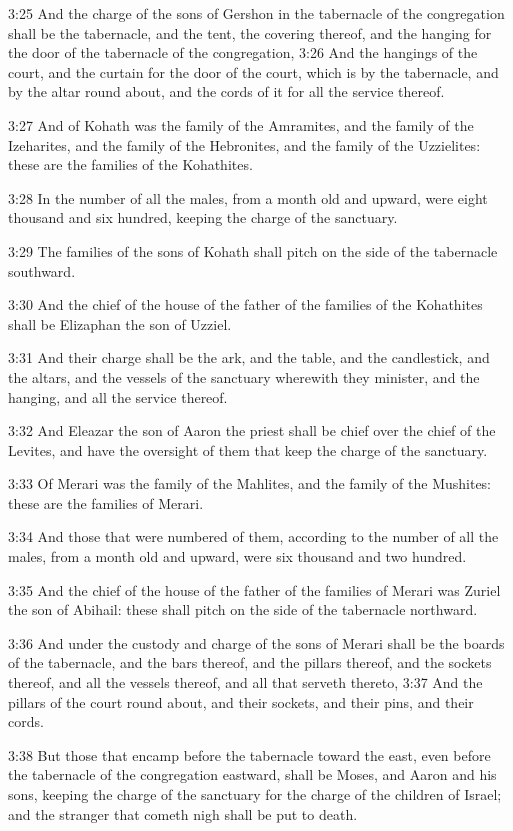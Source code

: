 3:25 And the charge of the sons of Gershon in the tabernacle of the congregation shall be the tabernacle, and the tent, the covering thereof, and the hanging for the door of the tabernacle of the congregation, 3:26 And the hangings of the court, and the curtain for the door of the court, which is by the tabernacle, and by the altar round about, and the cords of it for all the service thereof.

3:27 And of Kohath was the family of the Amramites, and the family of the Izeharites, and the family of the Hebronites, and the family of the Uzzielites: these are the families of the Kohathites.

3:28 In the number of all the males, from a month old and upward, were eight thousand and six hundred, keeping the charge of the sanctuary.

3:29 The families of the sons of Kohath shall pitch on the side of the tabernacle southward.

3:30 And the chief of the house of the father of the families of the Kohathites shall be Elizaphan the son of Uzziel.

3:31 And their charge shall be the ark, and the table, and the candlestick, and the altars, and the vessels of the sanctuary wherewith they minister, and the hanging, and all the service thereof.

3:32 And Eleazar the son of Aaron the priest shall be chief over the chief of the Levites, and have the oversight of them that keep the charge of the sanctuary.

3:33 Of Merari was the family of the Mahlites, and the family of the Mushites: these are the families of Merari.

3:34 And those that were numbered of them, according to the number of all the males, from a month old and upward, were six thousand and two hundred.

3:35 And the chief of the house of the father of the families of Merari was Zuriel the son of Abihail: these shall pitch on the side of the tabernacle northward.

3:36 And under the custody and charge of the sons of Merari shall be the boards of the tabernacle, and the bars thereof, and the pillars thereof, and the sockets thereof, and all the vessels thereof, and all that serveth thereto, 3:37 And the pillars of the court round about, and their sockets, and their pins, and their cords.

3:38 But those that encamp before the tabernacle toward the east, even before the tabernacle of the congregation eastward, shall be Moses, and Aaron and his sons, keeping the charge of the sanctuary for the charge of the children of Israel; and the stranger that cometh nigh shall be put to death.

